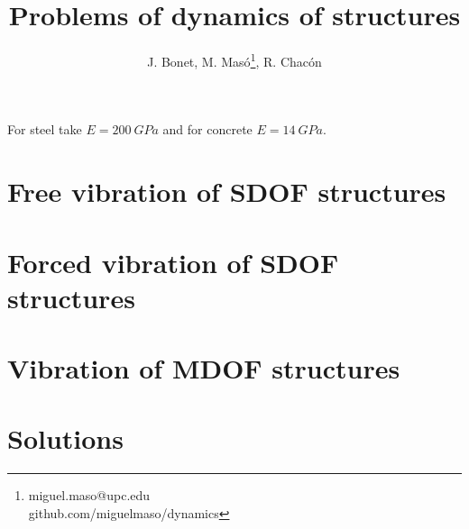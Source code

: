 \documentclass{problems}
\title[Dynamics of structures]{Problems of dynamics of structures}
\author{J. Bonet, M. Masó\thanks{miguel.maso@upc.edu\\github.com/miguelmaso/dynamics}, R. Chacón}
\begin{document}
\maketitle

For steel take $E=\SI{200}{GPa}$ and for concrete $E=\SI{14}{GPa}$.

\section{Free vibration of SDOF structures}





\section{Forced vibration of SDOF structures}







\section{Vibration of MDOF structures}




\newpage
\section{Solutions}
\shipoutAnswer

\printbibliography
\end{document}
